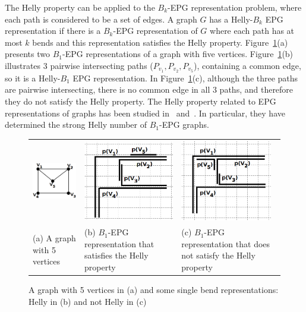 \documentclass[
submission
]{dmtcs-episciences}
\begin{document}
The Helly property can be applied to the $ B_k $-EPG representation problem, where each path is considered to be a set of edges. A graph $ G $ has a  Helly-$B_k$ EPG representation if there is a $ B_k $-EPG representation of $G$ where each path has at most $ k $ bends and this representation satisfies the Helly property. 
 Figure~\ref{fig:envelopeRepresentacoes}(a) presents two $B_1$-EPG representations of a graph with five vertices.  Figure~\ref{fig:envelopeRepresentacoes}(b)   illustrates 3 pairwise intersecting paths ($P_{v_1}, P_{v_2}, P_{v_5}$), containing a common edge, so it is a Helly-$B_1$ EPG representation. In Figure~\ref{fig:envelopeRepresentacoes}(c), although the three paths are pairwise intersecting, there is no common edge in all 3 paths, and therefore they do not satisfy the Helly property. 
The Helly property related to EPG representations of graphs has been studied in~\cite{golumbic2009} and~\cite{golumbic2013}. In particular, they have determined the strong Helly number of $B_1$-EPG graphs. 

%
\begin{figure}[h]
  \centering
  \begin{tabular}{ p{3.2cm} p{4.5cm} p{4.5cm} }
    \centering \includegraphics[width=3cm]{envelope} & \includegraphics[width=4cm]{envelopeHellyGradeTransparente} & \includegraphics[width=4cm]{envelopeNaoHellyGrade}
    \\
    \footnotesize \centering (a) A  graph with 5 vertices & \footnotesize(b) $B_1$-EPG representation that satisfies the Helly property & \footnotesize (c) $B_1$-EPG representation that does  not satisfy the Helly property  \\

  \end{tabular}
\caption{A  graph with 5 vertices in (a) and some single bend representations: Helly in (b) and not Helly in (c)} \label{fig:envelopeRepresentacoes}
\end{figure}
\end{document}
